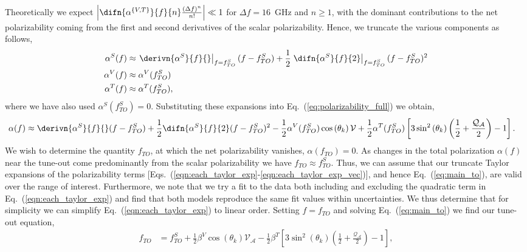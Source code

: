 	Theoretically we expect \(\left|\difn{\alpha^{\{V,T\}}}{f}{n} \frac{(\Delta f)^n}{n!}\right|\ll 1\) for \(\Delta f = 16\)~GHz and \(n\geq1\), with the dominant contributions to the net polarizability coming from the first and second derivatives of the scalar polarizability. Hence, we truncate the various components as follows,
	\begin{align}
	    \alpha^S(f) &\approx \left. \derivn{\alpha^S}{f}{{}}\right|_{f=f^{S}_{TO}} (f-f^{S}_{TO}) +\frac{1}{2}\left. \difn{\alpha^S}{f}{2}\right|_{f=f^{S}_{TO}}(f-f^{S}_{TO})^2 \label{eqn:each_taylor_exp}\\
	    \alpha^V(f) &\approx  \alpha^V(f^{S}_{TO}) \\
	    \alpha^T(f) &\approx  \alpha^T(f^{S}_{TO}),\label{eqn:each_taylor_exp_vec}
	\end{align}
	where we have also used \( \alpha^S(f^{S}_{TO})=0\). Substituting these expansions into Eq.~(\ref{eq:polarizability_full}) we obtain,
	\begin{align}
	    \alpha(f) &\approx \derivn{\alpha^S}{f}{{}}(f-f^{S}_{TO}) + \frac{1}{2} \difn{\alpha^S}{f}{2} (f-f^{S}_{TO})^2
	    -\frac{1}{2} \alpha^V(f^{S}_{TO}) \cos \left( \theta_k \right) \mathcal{V}  + 
	    \frac{1}{2} \alpha^T(f^{S}_{TO}) \left[3 \sin^2\left( \theta_k \right) \left(\frac{1}{2} +  \frac{\mathcal{Q_{A}}}{2}\right) -1 \right]  . \label{eq:main_to}
	\end{align}
	We wish to determine the quantity \(f_{TO}\), at which the net polarizability vanishes, \(\alpha(f_{TO})=0\). As changes in the total polarization \(\alpha(f)\) near the tune-out come predominantly from the scalar polarizability we have \(f_{TO}\approx f^{S}_{TO}\). Thus, we can assume that our truncate Taylor expansions of the polarizability terms [Eqs.~(\ref{eqn:each_taylor_exp}-\ref{eqn:each_taylor_exp_vec})], and hence Eq.~(\ref{eq:main_to}), are valid over the range of interest. Furthermore, we note that we try a fit to the data both including and excluding the quadratic term in Eq.~(\ref{eqn:each_taylor_exp}) and find that both models reproduce the same fit values within uncertainties. We thus determine that for simplicity we can simplify Eq.~(\ref{eqn:each_taylor_exp}) to linear order. Setting \(f=f_{TO}\) and solving Eq.~(\ref{eq:main_to}) we find our tune-out equation, 
	 \begin{align}
	    f_{TO} &= 
	    f^{S}_{TO}
	    +\frac{1}{2}\beta^V  \cos \left( \theta_k \right) \mathcal{V_{A}}
	    - \frac{1}{2}\beta^T  \left[3 \sin^2\left( \theta_k \right) \left(\frac{1}{2} +  \frac{\mathcal{Q_{A}}}{2}\right) -1 \right], \label{eqn:tune_out_eq} 
	\end{align}

